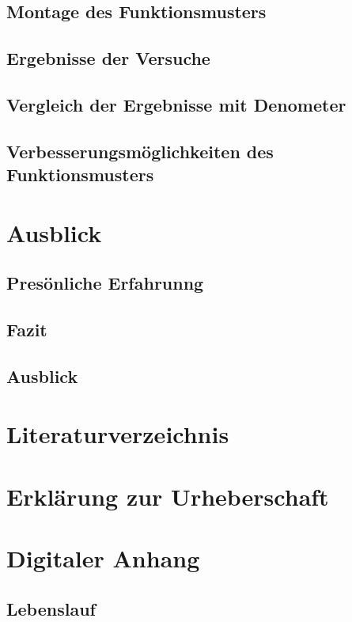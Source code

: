 \documentclass[a4paper,12pt]{article}
\begin{document}
\subsection{Montage des Funktionsmusters}

\subsection{Ergebnisse der Versuche}

\subsection{Vergleich der Ergebnisse mit Denometer}

\subsection{Verbesserungsmöglichkeiten des Funktionsmusters}

\newpage
\section{Ausblick}
\subsection{Presönliche Erfahrunng}

\subsection{Fazit}

\subsection{Ausblick}


\newpage
%
\section{Literaturverzeichnis}


\newpage
\section{Erklärung zur Urheberschaft}


\newpage
\listoffigures


\listoftables %
\newpage
\section{Digitaler Anhang}

\subsection*{Lebenslauf}

\end{document}
